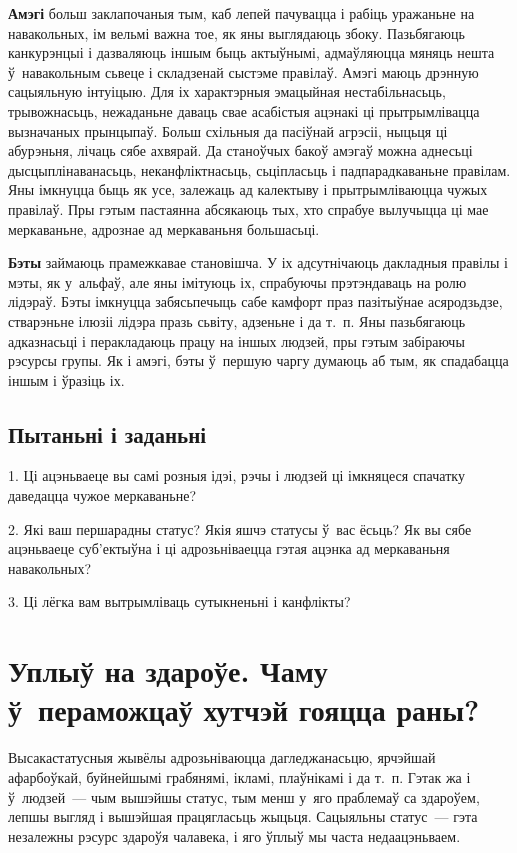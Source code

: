 \textbf{Амэгі} больш заклапочаныя тым, каб лепей пачувацца і рабіць уражаньне на навакольных, ім вельмі важна тое, як яны выглядаюць збоку. Пазьбягаюць канкурэнцыі і дазваляюць іншым быць актыўнымі, адмаўляюцца мяняць нешта ў~навакольным сьвеце і складзенай сыстэме правілаў. Амэгі маюць дрэнную сацыяльную інтуіцыю. Для іх характэрныя эмацыйная нестабільнасьць, трывожнасьць, нежаданьне даваць свае асабістыя ацэнакі ці прытрымлівацца вызначаных прынцыпаў. Больш схільныя да пасіўнай агрэсіі, ныцьця ці абурэньня, лічаць сябе ахвярай. Да станоўчых бакоў амэгаў можна аднесьці дысцыплінаванасьць, неканфліктнасьць, сьціпласьць і падпарадкаваньне правілам. Яны імкнуцца быць як усе, залежаць ад калектыву і прытрымліваюцца чужых правілаў. Пры гэтым пастаянна абсякаюць тых, хто спрабуе вылучыцца ці мае меркаваньне, адрознае ад меркаваньня большасьці.

\textbf{Бэты} займаюць прамежкавае становішча. У іх адсутнічаюць дакладныя правілы і мэты, як у~альфаў, але яны імітуюць іх, спрабуючы прэтэндаваць на ролю лідэраў. Бэты імкнуцца забясьпечыць сабе камфорт праз пазітыўнае асяродзьдзе, стварэньне ілюзіі лідэра празь сьвіту, адзеньне і да т.~п. Яны пазьбягаюць адказнасьці і перакладаюць працу на іншых людзей, пры гэтым забіраючы рэсурсы групы. Як і амэгі, бэты ў~першую чаргу думаюць аб тым, як спадабацца іншым і ўразіць іх.

\subsection*{Пытаньні і заданьні}

1. Ці ацэньваеце вы самі розныя ідэі, рэчы і людзей ці імкняцеся спачатку даведацца чужое меркаваньне?

2. Які ваш першарадны статус? Якія яшчэ статусы ў~вас ёсьць? Як вы сябе ацэньваеце суб'ектыўна і ці адрозьніваецца гэтая ацэнка ад меркаваньня навакольных?

3. Ці лёгка вам вытрымліваць сутыкненьні і канфлікты?


\section{Уплыў на здароўе. Чаму ў~пераможцаў хутчэй гояцца раны?}

Высакастатусныя жывёлы адрозьніваюцца дагледжанасьцю, ярчэйшай афарбоўкай, буйнейшымі грабянямі, ікламі, плаўнікамі і да т.~п. Гэтак жа і ў~людзей~--- чым вышэйшы статус, тым менш у~яго праблемаў са здароўем, лепшы выгляд і вышэйшая працягласьць жыцьця. Сацыяльны статус~--- гэта незалежны рэсурс здароўя чалавека, і яго ўплыў мы часта недаацэньваем. 

